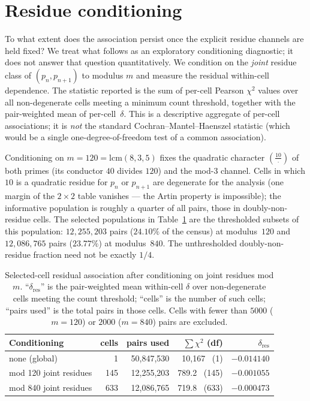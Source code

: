 \documentclass[11pt]{amsart}
\theoremstyle{definition}
\newcommand{\Lsym}[2]{\left(\tfrac{#1}{#2}\right)}
\begin{document}
\section{Residue conditioning}
\label{sec:decomposition}

To what extent does the association persist once the explicit residue channels
are held fixed? We treat what follows as an exploratory conditioning
diagnostic; it does not answer that question quantitatively. We condition on
the \emph{joint} residue class of
$(p_n, p_{n+1})$ to modulus $m$ and measure the residual within-cell
dependence. The statistic reported is the sum of per-cell Pearson $\chi^2$
values over all non-degenerate cells meeting a minimum count threshold,
together with the pair-weighted mean of per-cell~$\delta$. This is a
descriptive aggregate of per-cell associations; it is \emph{not} the standard
Cochran--Mantel--Haenszel statistic (which would be a single one-degree-of-freedom
test of a common association).

Conditioning on $m = 120 = \mathrm{lcm}(8,3,5)$ fixes the quadratic character
$\Lsym{10}{\cdot}$ of both primes (its conductor $40$ divides $120$) and the
mod-$3$ channel. Cells in which $10$ is a quadratic residue for $p_n$ or
$p_{n+1}$ are degenerate for the analysis (one margin of the $2\times2$ table
vanishes --- the Artin property is impossible); the informative population is
roughly a quarter of all pairs, those in doubly-non-residue cells. The
selected populations in Table~\ref{tab:decomp} are the thresholded subsets of
this population: $12{,}255{,}203$ pairs ($24.10\%$ of the census) at
modulus~$120$ and $12{,}086{,}765$ pairs ($23.77\%$) at modulus~$840$. The
unthresholded doubly-non-residue fraction need not be exactly $1/4$.

\begin{table}[ht]
	\centering
	\caption{Selected-cell residual association after conditioning on joint residues
		mod $m$.
		``$\delta_{\mathrm{res}}$'' is the pair-weighted mean within-cell $\delta$
		over non-degenerate cells meeting the count threshold;
		``cells'' is the number of such cells; ``pairs used'' is the total pairs
		in those cells. Cells with fewer than $5000$ ($m = 120$) or $2000$ ($m = 840$)
		pairs are excluded.}
	\label{tab:decomp}
	\begin{tabular}{lrrrr}
		\toprule
		Conditioning           & cells & pairs used     & $\sum \chi^2$ (df) & $\delta_{\mathrm{res}}$ \\
		\midrule
		none (global)          & 1     & 50{,}847{,}530 & 10{,}167 \ (1)     & $-0.014140$             \\
		mod 120 joint residues & 145   & 12{,}255{,}203 & 789.2 \ (145)      & $-0.001055$             \\
		mod 840 joint residues & 633   & 12{,}086{,}765 & 719.8 \ (633)      & $-0.000473$             \\
		\bottomrule
	\end{tabular}
\end{table}
\end{document}
